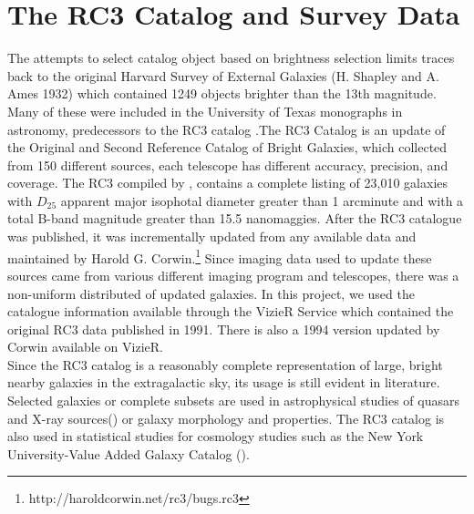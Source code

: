 \documentclass[5p]{elsarticle}
\begin{document}
\section{The RC3 Catalog and Survey Data}
The attempts to select catalog object based on brightness selection limits traces back to the original Harvard Survey of External Galaxies (H. Shapley and A. Ames 1932) which contained 1249 objects brighter than the 13th magnitude. Many of these were included in the University of Texas monographs in astronomy, predecessors to the  RC3 catalog .The RC3 Catalog is an update of the Original and Second Reference Catalog of Bright Galaxies, which collected from 150 different sources, each telescope has different accuracy, precision, and coverage. The RC3 compiled by \citet{rc3}, contains a  complete listing of 23,010 galaxies with $D_25$ apparent major isophotal diameter  greater than 1 arcminute and with a total B-band magnitude greater than 15.5 nanomaggies. After the RC3 catalogue was published, it was incrementally updated from any available data and maintained by Harold G. Corwin.\footnote{http://haroldcorwin.net/rc3/bugs.rc3} Since imaging data used to update these sources came from various different imaging program and telescopes, there was a non-uniform distributed of updated galaxies. In this project, we used the catalogue information available through the VizieR Service  which contained the original  RC3 data published in 1991. There is also a 1994 version updated by Corwin available on VizieR. 
\\
\indent  Since the RC3 catalog 
 is a reasonably complete representation of large, bright nearby galaxies in the extragalactic sky, its 
usage is still evident in literature. Selected galaxies or complete subsets are used in astrophysical studies of  quasars and X-ray sources(\citet{xray}) or  galaxy morphology and properties.  The RC3 catalog is also used in statistical studies  for cosmology studies such as the New York University-Value Added Galaxy Catalog (\citet{nyuvagc}).
\end{document}
